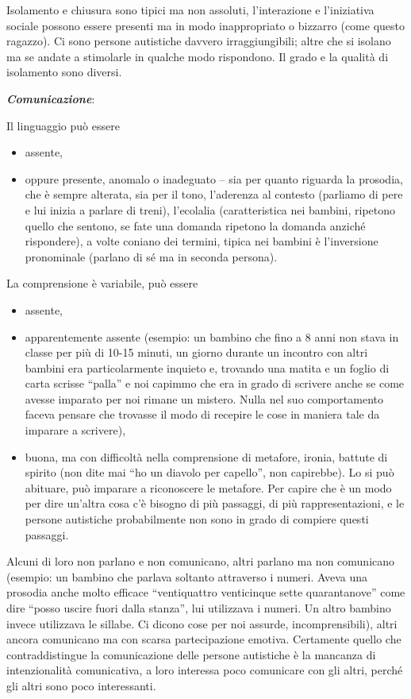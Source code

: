 Isolamento e chiusura sono tipici ma non assoluti, l'interazione e
l'iniziativa sociale possono essere presenti ma in modo inappropriato o
bizzarro (come questo ragazzo). Ci sono persone autistiche davvero
irraggiungibili; altre che si isolano ma se andate a stimolarle in
qualche modo rispondono. Il grado e la qualità di isolamento sono
diversi.

\emph{\textbf{Comunicazione}}:

Il linguaggio può essere

\begin{itemize}
\item
  assente,
\item
  oppure presente, anomalo o inadeguato -- sia per quanto riguarda la
  prosodia, che è sempre alterata, sia per il tono, l'aderenza al
  contesto (parliamo di pere e lui inizia a parlare di treni),
  l'ecolalia (caratteristica nei bambini, ripetono quello che sentono,
  se fate una domanda ripetono la domanda anziché rispondere), a volte
  coniano dei termini, tipica nei bambini è l'inversione pronominale
  (parlano di sé ma in seconda persona).
\end{itemize}

La comprensione è variabile, può essere

\begin{itemize}
\item
  assente,
\item
  apparentemente assente (esempio: un bambino che fino a 8 anni non
  stava in classe per più di 10-15 minuti, un giorno durante un incontro
  con altri bambini era particolarmente inquieto e, trovando una matita
  e un foglio di carta scrisse ``palla'' e noi capimmo che era in grado
  di scrivere anche se come avesse imparato per noi rimane un mistero.
  Nulla nel suo comportamento faceva pensare che trovasse il modo di
  recepire le cose in maniera tale da imparare a scrivere),
\item
  buona, ma con difficoltà nella comprensione di metafore, ironia,
  battute di spirito (non dite mai ``ho un diavolo per capello'', non
  capirebbe). Lo si può abituare, può imparare a riconoscere le
  metafore. Per capire che è un modo per dire un'altra cosa c'è bisogno
  di più passaggi, di più rappresentazioni, e le persone autistiche
  probabilmente non sono in grado di compiere questi passaggi.
\end{itemize}

Alcuni di loro non parlano e non comunicano, altri parlano ma non
comunicano (esempio: un bambino che parlava soltanto attraverso i
numeri. Aveva una prosodia anche molto efficace ``ventiquattro
venticinque sette quarantanove'' come dire ``posso uscire fuori dalla
stanza'', lui utilizzava i numeri. Un altro bambino invece utilizzava le
sillabe. Ci dicono cose per noi assurde, incomprensibili), altri ancora
comunicano ma con scarsa partecipazione emotiva. Certamente quello che
contraddistingue la comunicazione delle persone autistiche è la mancanza
di intenzionalità comunicativa, a loro interessa poco comunicare con gli
altri, perché gli altri sono poco interessanti.

